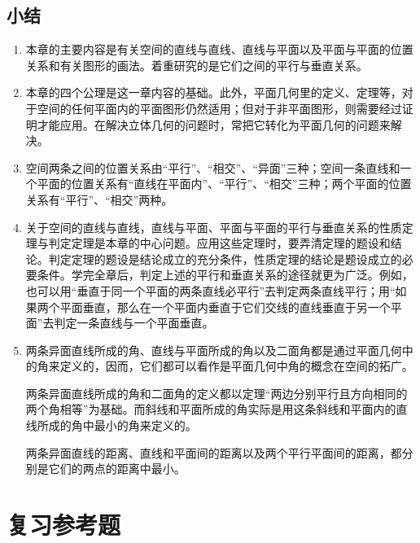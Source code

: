 \section*{小结}
\begin{enumerate}[C、,itemindent=4.5em]
  \item 本章的主要内容是有关空间的直线与直线、直线与平面以及平面与平面的位置关系和有关图形的画法。着重研究的是它们之间的平行与垂直关系。
  \item 本章的四个公理是这一章内容的基础。此外，平面几何里的定义、定理等，对于空间的任何平面内的平面图形仍然适用；但对于非平面图形，则需要经过证明才能应用。在解决立体几何的问题时，常把它转化为平面几何的问题来解决。
  \item 空间两条之间的位置关系由“平行”、“相交”、“异面”三种；空间一条直线和一个平面的位置关系有“直线在平面内”、“平行”、“相交”三种；两个平面的位置关系有“平行”、“相交”两种。
  \item 关于空间的直线与直线，直线与平面、平面与平面的平行与垂直关系的性质定理与判定定理是本章的中心问题。应用这些定理时，要弄清定理的题设和结论。判定定理的题设是结论成立的充分条件，性质定理的结论是题设成立的必要条件。学完全章后，判定上述的平行和垂直关系的途径就更为广泛。例如，也可以用“垂直于同一个平面的两条直线必平行”去判定两条直线平行；用“如果两个平面垂直，那么在一个平面内垂直于它们交线的直线垂直于另一个平面”去判定一条直线与一个平面垂直。
  \item 两条异面直线所成的角、直线与平面所成的角以及二面角都是通过平面几何中的角来定义的，因而，它们都可以看作是平面几何中角的概念在空间的拓广。
  
  两条异面直线所成的角和二面角的定义都以定理“两边分别平行且方向相同的两个角相等”为基础。而斜线和平面所成的角实际是用这条斜线和平面内的直线所成的角中最小的角来定义的。

  两条异面直线的距离、直线和平面间的距离以及两个平行平面间的距离，都分别是它们的两点的距离中最小。
\end{enumerate}
\chapter*{复习参考题}
